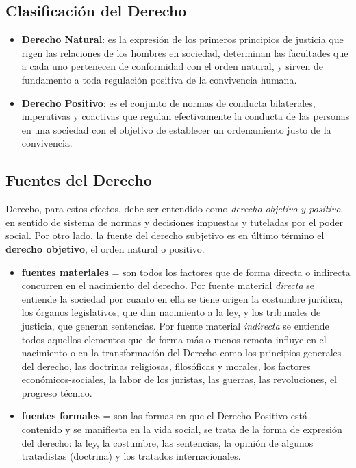 \documentclass[]{article}
\providecommand{\tightlist}{%
  \setlength{\itemsep}{0pt}\setlength{\parskip}{0pt}}
\begin{document}
\hypertarget{clasificaciuxf3n-del-derecho}{%
\subsection{Clasificación del
Derecho}\label{clasificaciuxf3n-del-derecho}}

\begin{itemize}
\tightlist
\item
  \textbf{Derecho Natural}: es la expresión de los primeros principios
  de justicia que rigen las relaciones de los hombres en sociedad,
  determinan las facultades que a cada uno pertenecen de conformidad con
  el orden natural, y sirven de fundamento a toda regulación positiva de
  la convivencia humana.
\item
  \textbf{Derecho Positivo}: es el conjunto de normas de conducta
  bilaterales, imperativas y coactivas que regulan efectivamente la
  conducta de las personas en una sociedad con el objetivo de establecer
  un ordenamiento justo de la convivencia.
\end{itemize}

\hypertarget{fuentes-del-derecho}{%
\subsection{Fuentes del Derecho}\label{fuentes-del-derecho}}

Derecho, para estos efectos, debe ser entendido como \emph{derecho
objetivo y positivo}, en sentido de sistema de normas y decisiones
impuestas y tuteladas por el poder social. Por otro lado, la fuente del
derecho subjetivo es en último término el \textbf{derecho objetivo}, el
orden natural o positivo.

\begin{itemize}
\item
  \textbf{fuentes materiales} = son todos los factores que de forma
  directa o indirecta concurren en el nacimiento del derecho. Por fuente
  material \emph{directa} se entiende la sociedad por cuanto en ella se
  tiene origen la costumbre jurídica, los órganos legislativos, que dan
  nacimiento a la ley, y los tribunales de justicia, que generan
  sentencias. Por fuente material \emph{indirecta} se entiende todos
  aquellos elementos que de forma más o menos remota influye en el
  nacimiento o en la transformación del Derecho como los principios
  generales del derecho, las doctrinas religiosas, filosóficas y
  morales, los factores económicos-sociales, la labor de los juristas,
  las guerras, las revoluciones, el progreso técnico.
\item
  \textbf{fuentes formales} = son las formas en que el Derecho Positivo
  está contenido y se manifiesta en la vida social, se trata de la forma
  de expresión del derecho: la ley, la costumbre, las sentencias, la
  opinión de algunos tratadistas (doctrina) y los tratados
  internacionales.
\end{itemize}
\end{document}
